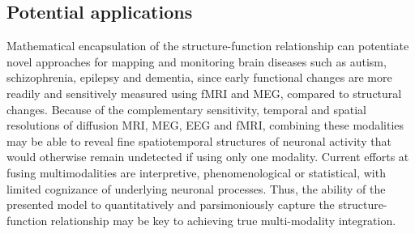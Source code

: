 \subsection{Potential applications}

Mathematical encapsulation of the structure-function relationship can
potentiate novel approaches for mapping and monitoring brain diseases
such as autism, schizophrenia, epilepsy and dementia, since early
functional changes are more readily and sensitively measured using fMRI
and MEG, compared to structural changes. Because of the complementary
sensitivity, temporal and spatial resolutions of diffusion MRI, MEG, EEG
and fMRI, combining these modalities may be able to reveal fine
spatiotemporal structures of neuronal activity that would otherwise
remain undetected if using only one modality. Current efforts at fusing
multimodalities are interpretive, phenomenological or statistical, with
limited cognizance of underlying neuronal processes. Thus, the ability
of the presented model to quantitatively and parsimoniously capture the
structure-function relationship may be key to achieving true
multi-modality integration.